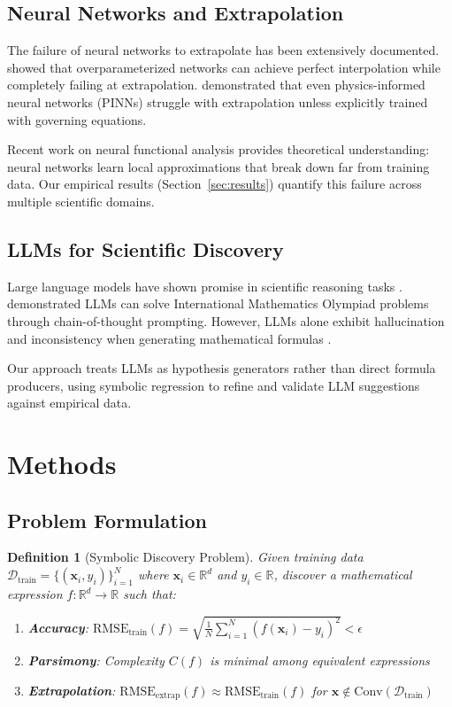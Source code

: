 \documentclass[twoside,11pt]{article}
\newtheorem{definition}{Definition}
\newcommand{\R}{\mathbb{R}}
\begin{document}
\subsection{Neural Networks and Extrapolation}

The failure of neural networks to extrapolate has been extensively documented. \citet{belkin2019reconciling} showed that overparameterized networks can achieve perfect interpolation while completely failing at extrapolation. \citet{xu2020neural} demonstrated that even physics-informed neural networks (PINNs) struggle with extrapolation unless explicitly trained with governing equations.

Recent work on neural functional analysis \citep{zhou2020universality} provides theoretical understanding: neural networks learn local approximations that break down far from training data. Our empirical results (Section~\ref{sec:results}) quantify this failure across multiple scientific domains.

\subsection{LLMs for Scientific Discovery}

Large language models have shown promise in scientific reasoning tasks \citep{taylor2022galactica, lewkowycz2022minerva}. \citet{romera2023mathematical} demonstrated LLMs can solve International Mathematics Olympiad problems through chain-of-thought prompting. However, LLMs alone exhibit hallucination and inconsistency when generating mathematical formulas \citep{kambhampati2024llms}.

Our approach treats LLMs as hypothesis generators rather than direct formula producers, using symbolic regression to refine and validate LLM suggestions against empirical data.

\section{Methods}
\label{sec:methods}

\subsection{Problem Formulation}

\begin{definition}[Symbolic Discovery Problem]
Given training data $\mathcal{D}_{\text{train}} = \{(\mathbf{x}_i, y_i)\}_{i=1}^N$ where $\mathbf{x}_i \in \R^d$ and $y_i \in \R$, discover a mathematical expression $f: \R^d \to \R$ such that:
\begin{enumerate}
    \item \textbf{Accuracy}: $\text{RMSE}_{\text{train}}(f) = \sqrt{\frac{1}{N}\sum_{i=1}^N (f(\mathbf{x}_i) - y_i)^2} < \epsilon$
    \item \textbf{Parsimony}: Complexity $C(f)$ is minimal among equivalent expressions
    \item \textbf{Extrapolation}: $\text{RMSE}_{\text{extrap}}(f) \approx \text{RMSE}_{\text{train}}(f)$ for $\mathbf{x} \notin \text{Conv}(\mathcal{D}_{\text{train}})$
\end{enumerate}
\end{definition}
\end{document}
